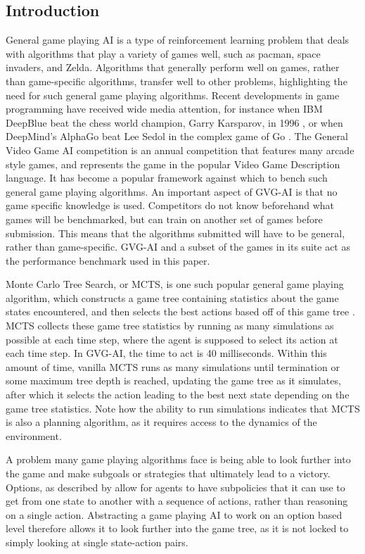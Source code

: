 \documentclass[12pt,a4paper]{article}
\begin{document}
\begin{multicols}{2}
\section{Introduction}
General game playing AI is a type of reinforcement learning problem that deals with algorithms that play a variety of games well, such as pacman, space invaders, and Zelda. Algorithms that generally perform well on games, rather than game-specific algorithms, transfer well to other problems, highlighting the need for such general game playing algorithms. Recent developments in game programming have received wide media attention, for instance when IBM DeepBlue beat the chess world champion, Garry Karsparov, in 1996 \cite{Campbell:2002:DB:512148.512152}, or when DeepMind's AlphaGo beat Lee Sedol in the complex game of Go \cite{Silver_2016}. The General Video Game AI competition is an annual competition that features many arcade style games, and represents the game in the popular Video Game Description language. It has become a popular framework against which to bench such general game playing algorithms. An important aspect of GVG-AI is that no game specific knowledge is used. Competitors do not know beforehand what games will be benchmarked, but can train on another set of games before submission. This means that the algorithms submitted will have to be general, rather than game-specific. GVG-AI and a subset of the games in its suite act as the performance benchmark used in this paper.

Monte Carlo Tree Search, or MCTS, is one such popular general game playing algorithm, which constructs a game tree containing statistics about the game states encountered, and then selects the best actions based off of this game tree \cite{Coulom06mcts}. MCTS collects these game tree statistics by running as many simulations as possible at each time step, where the agent is supposed to select its action at each time step. In GVG-AI, the time to act is 40 milliseconds. Within this amount of time, vanilla MCTS runs as many simulations until termination or some maximum tree depth is reached, updating the game tree as it simulates, after which it selects the action leading to the best next state depending on the game tree statistics. Note how the ability to run simulations indicates that MCTS is also a planning algorithm, as it requires access to the dynamics of the environment.

A problem many game playing algorithms face is being able to look further into the game and make subgoals or strategies that ultimately lead to a victory. Options, as described by  allow for agents to have subpolicies that it can use to get from one state to another with a sequence of actions, rather than reasoning on a single action. Abstracting a game playing AI to work on an option based level therefore allows it to look further into the game tree, as it is not locked to simply looking at single state-action pairs.


\end{multicols}
\end{document}

